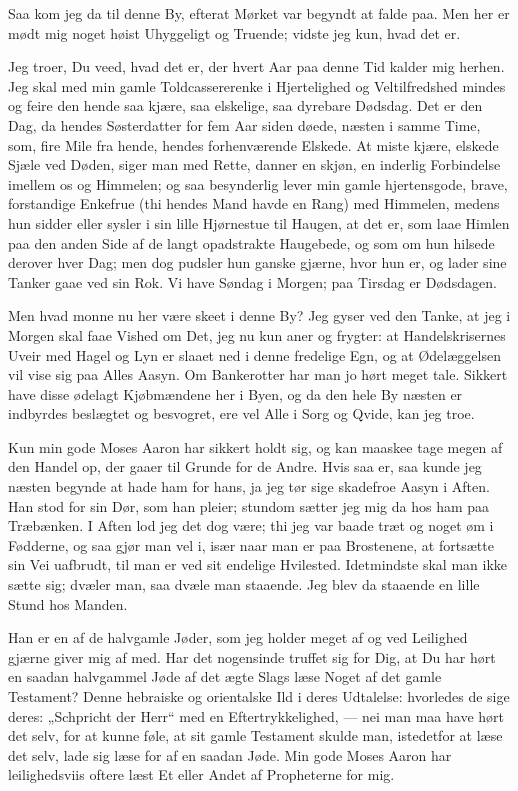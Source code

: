 \documentclass[12pt,a4paper]{book}
\newcommand{\apage}[1]{\marginnote{\footnotesize\textit{[#1]}}}
\begin{document}
Saa kom jeg da til denne By, efterat Mørket var begyndt at falde paa.
Men her er mødt
mig \apage{6}  noget høist Uhyggeligt og Truende; vidste jeg kun, hvad det er.

Jeg troer, Du veed, hvad det er, der hvert Aar paa denne Tid kalder mig
herhen. Jeg skal med min gamle Toldcassererenke i Hjertelighed og
Veltilfredshed mindes og feire den hende saa kjære, saa elskelige, saa
dyrebare Dødsdag. Det er den Dag, da hendes Søsterdatter for fem Aar
siden døede, næsten i samme Time, som, fire Mile fra hende, hendes
forhenværende Elskede. At miste kjære, elskede Sjæle ved Døden, siger
man med Rette, danner en skjøn, en inderlig Forbindelse imellem os og
Himmelen; og saa besynderlig lever min gamle hjertensgode, brave,
forstandige Enkefrue (thi hendes Mand havde en Rang) med Himmelen,
medens hun sidder eller sysler i sin lille Hjørnestue til Haugen, at det
er, som laae Himlen paa den anden Side af de langt opadstrakte
Haugebede, og som om hun hilsede derover hver Dag; men dog pudsler hun
ganske gjærne, hvor hun er, og lader sine Tanker gaae ved sin Rok. Vi
have Søndag i Morgen; paa Tirsdag er Dødsdagen.

Men hvad monne nu her være skeet i denne By? Jeg gyser ved den Tanke, at
jeg i Morgen skal faae Vished om Det, jeg nu kun aner og frygter: at
Handelskrisernes Uveir med Hagel og Lyn er slaaet ned i denne fredelige
Egn, og
at \apage{7}  Ødelæggelsen vil vise sig paa Alles Aasyn. Om Bankerotter har man jo
hørt meget tale. Sikkert have disse ødelagt Kjøbmændene her i Byen, og
da den hele By næsten er indbyrdes beslægtet og besvogret, ere vel Alle
i Sorg og Qvide, kan jeg troe.

Kun min gode Moses Aaron har sikkert holdt sig, og kan maaskee tage
megen af den Handel op, der gaaer til Grunde for de Andre. Hvis saa er,
saa kunde jeg næsten begynde at hade ham for hans, ja jeg tør sige
skadefroe Aasyn i Aften. Han stod for sin Dør, som han pleier; stundom
sætter jeg mig da hos ham paa Træbænken. I Aften lod jeg det dog være;
thi jeg var baade træt og noget øm i Fødderne, og saa gjør man vel i,
især naar man er paa Brostenene, at fortsætte sin Vei uafbrudt, til man
er ved sit endelige Hvilested. Idetmindste skal man ikke sætte sig;
dvæler man, saa dvæle man staaende. Jeg blev da staaende en lille Stund
hos Manden.

Han er en af de halvgamle Jøder, som jeg holder meget af og ved
Leilighed gjærne giver mig af med. Har det nogensinde truffet sig for
Dig, at Du har hørt en saadan halvgammel Jøde af det ægte Slags læse
Noget af det gamle Testament? Denne hebraiske og orientalske Ild i deres
Udtalelse: hvorledes de sige deres: „Schpricht der Herr“ med en
Eftertrykkelighed,
--- \apage{8}  nei man maa have hørt det selv, for at kunne føle, at sit gamle
Testament skulde man, istedetfor at læse det selv, lade sig læse for af
en saadan Jøde. Min gode Moses Aaron har leilighedsviis oftere læst Et
eller Andet af Propheterne for mig.
\end{document}
